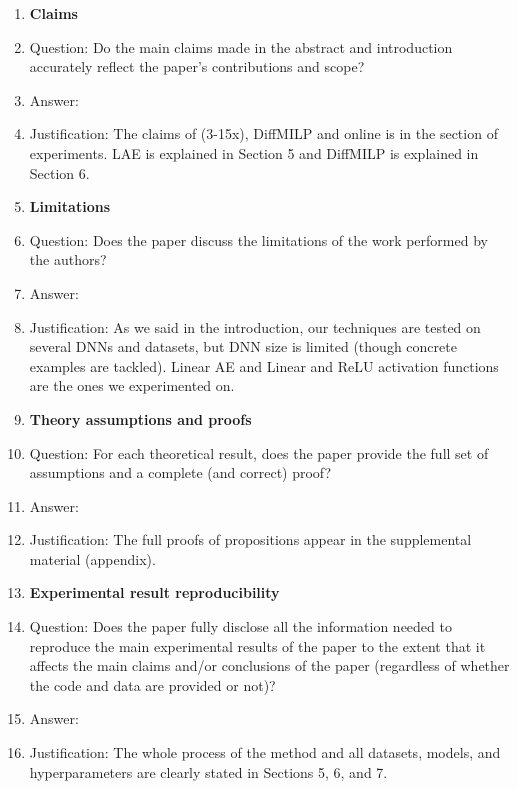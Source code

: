 \begin{enumerate}
	
	\item {\bf Claims}
	\item[] Question: Do the main claims made in the abstract and introduction accurately reflect the paper's contributions and scope?
	\item[] Answer: \answerYes{} %
	\item[] Justification: The claims of (3-15x), DiffMILP and online is in the section of experiments. LAE is explained in Section 5 and DiffMILP is explained in Section 6.

	
	\item {\bf Limitations}
	\item[] Question: Does the paper discuss the limitations of the work performed by the authors?
	\item[] Answer: \answerYes{} %
	\item[] Justification: As we said in the introduction, our techniques are tested on several DNNs and datasets, but DNN size is limited (though concrete examples are tackled). 
	Linear AE and Linear and ReLU activation functions are the ones we experimented on. 

	
	\item {\bf Theory assumptions and proofs}
	\item[] Question: For each theoretical result, does the paper provide the full set of assumptions and a complete (and correct) proof?
	\item[] Answer: \answerYes{} %
	\item[] Justification: The full proofs of propositions appear in the supplemental material (appendix).

	
	\item {\bf Experimental result reproducibility}
	\item[] Question: Does the paper fully disclose all the information needed to reproduce the main experimental results of the paper to the extent that it affects the main claims and/or conclusions of the paper (regardless of whether the code and data are provided or not)?
	\item[] Answer: \answerYes{} %
	\item[] Justification: The whole process of the method and all datasets, models, and hyperparameters are clearly stated in Sections 5, 6, and 7.


\end{enumerate}
